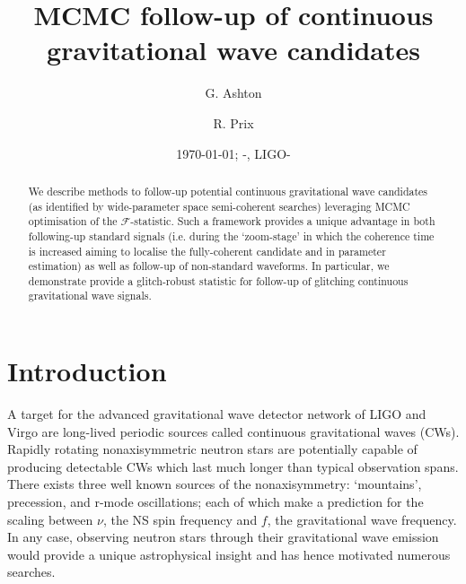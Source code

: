 \documentclass[aps, prd, twocolumn, superscriptaddress, floatfix, showpacs, nofootinbib, longbibliography]{revtex4-1}
\newcommand{\dcc}{LIGO-{\color{red}}}
\begin{document}
\title{MCMC follow-up of continuous gravitational wave candidates}

    \author{G. Ashton}
    \author{R. Prix}

\date{\today}

\begin{abstract}

We describe methods to follow-up potential continuous gravitational wave
candidates (as identified by wide-parameter space semi-coherent searches)
leveraging MCMC optimisation of the $\mathcal{F}$-statistic.  Such a framework
provides a unique advantage in both following-up standard signals (i.e. during
the `zoom-stage' in which the coherence time is increased aiming to localise
the fully-coherent candidate and in parameter estimation) as well as follow-up
of non-standard waveforms. In particular, we demonstrate provide a
glitch-robust statistic for follow-up of glitching continuous gravitational
wave signals.

\end{abstract}


\date{\commitDATE; \commitIDshort-\commitSTATUS, \dcc}

\maketitle


\section{Introduction}

A target for the advanced gravitational wave detector network of LIGO
and Virgo are long-lived periodic sources called continuous gravitational waves (CWs).
Rapidly rotating nonaxisymmetric neutron stars are potentially capable of
producing detectable CWs which last much longer than typical observation spans.
There exists three well known sources of the nonaxisymmetry: `mountains',
precession, and r-mode oscillations; each of which make a prediction for the
scaling between $\nu$, the NS spin frequency and $f$, the gravitational wave
frequency. In any case, observing neutron stars through their gravitational
wave emission would provide a unique astrophysical insight and has hence
motivated numerous searches.
\end{document}
